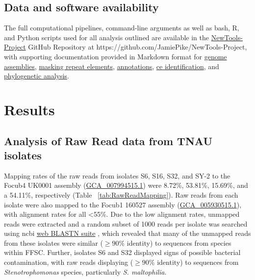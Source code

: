 \subsection{Data and software availability}

The full computational pipelines, command-line arguments as well as bash, R, and Python scripts used for all analysis outlined are available in the \href{https://github.com/JamiePike/NewTools-Project}{NewTools-Project} GitHub Repository at https://github.com/JamiePike/NewTools-Project, with supporting documentation provided in Markdown format for \href{https://github.com/JamiePike/NewTools-Project/blob/master/docs/Assembly/AssemblyNotes.md}{genome assemblies}, \href{https://github.com/JamiePike/NewTools-Project/blob/master/docs/Annotations/RepeatMaskingNotes.md}{masking repeat elements}, \href{https://github.com/JamiePike/NewTools-Project/blob/master/docs/Annotations/Annotations.md}{annotations}, \href{https://github.com/JamiePike/NewTools-Project/blob/master/docs/Effectors/PredicitionofCandidateEffectors.md}{\ac{ce} identification}, and \href{https://github.com/JamiePike/NewTools-Project/blob/master/docs/Phylogeny/Phylogenies.md}{phylogenetic analysis}.

\newpage
\section{Results}

\subsection{Analysis of Raw Read data from TNAU isolates}

Mapping rates of the raw reads from isolates S6, S16, S32, and SY-2 to the \ac{Focub4} UK0001 assembly (\href{https://www.ncbi.nlm.nih.gov/datasets/genome/GCA_007994515.1/}{GCA\_007994515.1}) were 8.72\%, 53.81\%, 15.69\%, and a 54.11\%, respectively (Table ~\ref{tab:RawReadMapping}). Raw reads from each isolate were also mapped to the \ac{Focub1} 160527 assembly (\href{https://www.ncbi.nlm.nih.gov/datasets/genome/GCA_005930515.1/}{GCA\_005930515.1}), with alignment rates for all \textless 55\%. Due to the low alignment rates, unmapped reads were extracted and a random subset of 1000 reads per isolate was searched using \ac{ncbi} \href{https://blast.ncbi.nlm.nih.gov/Blast.cgi?PROGRAM=blastn&BLAST_SPEC=GeoBlast&PAGE_TYPE=BlastSearch}{web BLASTN suite} \parencite{Nih2014}, which revealed that many of the unmapped reads from these isolates were similar ($\geq90\% $ identity) to sequences from species within \ac{FFSC}. Further, isolates S6 and S32 displayed signs of possible bacterial contamination, with raw reads displaying ($ \geq90\% $ identity) to sequences from \textit{Stenotrophomonas} species, particularly \textit{S. maltophilia}. 

